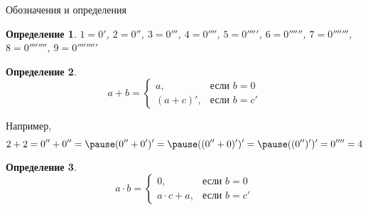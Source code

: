 \documentclass[handout]{beamer}
\newtheorem{dfn}{Определение}[section]
\begin{document}
\begin{frame}{Обозначения и определения}
\begin{dfn}
$1 = 0'$, $2 = 0''$, $3 = 0'''$, $4 = 0''''$, $5 = 0'''''$, $6 = 0''''''$,
$7 = 0'''''''$, $8 = 0''''''''$, $9 = 0'''''''''$
\end{dfn}\pause
\begin{dfn}\vspace{-0.3cm}
$$a + b = \left\{ \begin{array}{ll} a, & \mbox{если } b = 0\\
                                    (a + c)', & \mbox{если } b = c'
                  \end{array}\right.$$
\end{dfn}\pause\vspace{-0.3cm}
Например, $$2 + 2 = 0'' + 0'' = \pause (0'' + 0')' = \pause ((0'' + 0)')' = \pause ((0'')')' = 0'''' = 4$$\pause\vspace{-0.3cm}
\begin{dfn}\vspace{-0.3cm}
$$a \cdot b = \left\{ \begin{array}{ll} 0, & \mbox{если } b = 0\\
                                    a \cdot c + a, & \mbox{если } b = c'
                  \end{array}\right.$$
\end{dfn}
\end{frame}
\end{document}

